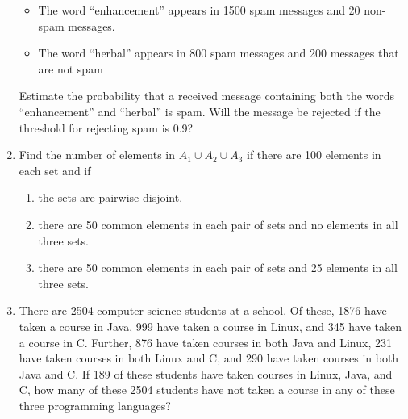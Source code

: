 \documentclass[12pt]{article}
\begin{document}
\begin{enumerate}
\begin{itemize}
\item The word ``enhancement'' appears in 1500 spam messages and 20 non-spam messages.

\item The word ``herbal'' appears in 800 spam messages and 200 messages that are not spam

\end{itemize}
%
Estimate the probability that a received message containing both the words
``enhancement'' and ``herbal'' is spam. Will the message be rejected if the threshold for rejecting spam is 0.9?

\vfill

\newpage



\item Find the number of elements in $A_1 \cup A_2 \cup A_3$ if there are 100 elements in each set and if

\begin{enumerate}
    \item the sets are pairwise disjoint.
    \item there are 50 common elements in each pair of sets and no elements in all three sets.
    \item there are 50 common elements in each pair of sets and 25 elements in all three sets.
\end{enumerate}

\vfill



\item There are 2504 computer science students at a school. Of these, 1876 have taken a course in Java, 999 have taken a course in Linux, and 345 have taken a course in C. Further, 876 have taken courses in both Java and Linux, 231 have taken courses in both Linux and C, and 290 have taken courses in both Java and C. If 189 of these students have taken courses in Linux, Java, and C, how many of these 2504 students have not taken a course in any of these three programming languages?

\vfill

\end{enumerate} %
\end{document}
